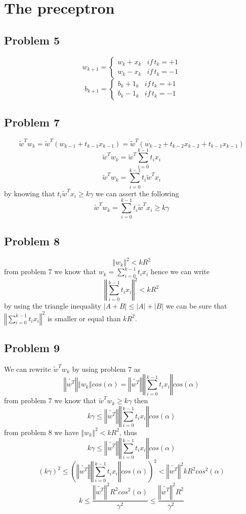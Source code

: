 \section{The preceptron}

\subsection*{Problem 5}
\[
w_{k+1}=\begin{cases}
w_{k}+x_{k} & if\, t_{k}=+1\\
w_{k}-x_{k} & if\, t_{k}=-1
\end{cases}
\]
\[
b_{k+1}=\begin{cases}
b_{k}+1_{k} & if\, t_{k}=+1\\
b_{k}-1_{k} & if\, t_{k}=-1
\end{cases}
\]


\subsection*{Problem 7}
\[
\tilde{w}^{T}w_{k}=\tilde{w}^{T}\left(w_{k-1}+t_{k-1}x_{k-1}\right)=\tilde{w}^{T}\left(w_{k-2}+t_{k-2}x_{k-2}+t_{k-1}x_{k-1}\right)
\]
\[
\tilde{w}^{T}w_{k}=\tilde{w}^{T}\sum_{i=0}^{k-1}t_{i}x_{i}
\]
\[
\tilde{w}^{T}w_{k}=\sum_{i=0}^{k-1}t_{i}\tilde{w}^{T}x_{i}
\]
by knowing that $t_{i}\tilde{w}^{T}x_{i}\geq k\gamma$ we can assert
the following
\[
\tilde{w}^{T}w_{k}=\sum_{i=0}^{k-1}t_{i}\tilde{w}^{T}x_{i}\geq k\gamma
\]


\subsection*{Problem 8}
\[
\left\Vert w_{k}\right\Vert ^{2}<kR^{2}
\]
from problem 7 we know that $w_{k}=\sum_{i=0}^{k-1}t_{i}x_{i}$ hence
we can write 
\[
\left\Vert \sum_{i=0}^{k-1}t_{i}x_{i}\right\Vert ^{2}<kR^{2}
\]
by using the triangle inequality
$\left|A+B\right|\leq\left|A\right|+\left|B\right|$
we can be sure that $\left\Vert \sum_{i=0}^{k-1}t_{i}x_{i}\right\Vert ^{2}$
is smaller or equal than $kR^{2}$.



\subsection*{Problem 9}
We can rewrite $\tilde{w}^{T}w_{k}$ by using problem 7 as 
\[
\left\Vert \tilde{w^{T}}\right\Vert \left\Vert w_{k}\right\Vert
cos(\alpha)=\left\Vert \tilde{w^{T}}\right\Vert \left\Vert
\sum_{i=0}^{k-1}t_{i}x_{i}\right\Vert cos(\alpha)
\]
from problem 7 we know that $\tilde{w}^{T}w_{k}\geq k\gamma$ then
\[
k\gamma\leq\left\Vert \tilde{w^{T}}\right\Vert \left\Vert
\sum_{i=0}^{k-1}t_{i}x_{i}\right\Vert cos(\alpha)
\]
from problem 8 we have $\left\Vert w_{k}\right\Vert ^{2}<kR^{2}$,
thus 
\[
k\gamma\leq\left\Vert \tilde{w^{T}}\right\Vert \left\Vert
\sum_{i=0}^{k-1}t_{i}x_{i}\right\Vert cos(\alpha)
\]
\[
\left(k\gamma\right)^{2}\leq\left(\left\Vert \tilde{w^{T}}\right\Vert
\left\Vert \sum_{i=0}^{k-1}t_{i}x_{i}\right\Vert
cos(\alpha)\right)^{2}<\left\Vert \tilde{w^{T}}\right\Vert
^{2}kR^{2}cos^{2}(\alpha)
\]
\[
k\leq\frac{\left\Vert \tilde{w^{T}}\right\Vert
^{2}R^{2}cos^{2}(\alpha)}{\gamma^{2}}\leq\frac{\left\Vert
\tilde{w^{T}}\right\Vert ^{2}R^{2}}{\gamma^{2}}
\]
  
